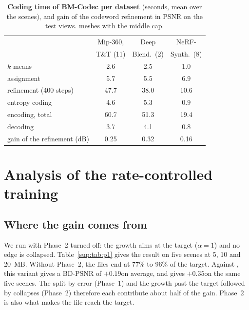 \begin{table}[h]\centering\footnotesize
\caption{\textbf{Coding time of BM-Codec per dataset} (seconds, mean over the scenes), and gain of the codeword refinement in PSNR on the test views. \MSc meshes with the middle cap.}
\label{sup:tab:time}
\setlength{\tabcolsep}{3pt}
\begin{tabular}{@{}lccc@{}}
\toprule
 & Mip-360, & Deep & NeRF- \\
 & T\&T (11) & Blend.\ (2) & Synth.\ (8) \\
\midrule
$k$-means & 2.6 & 2.5 & 1.0 \\
assignment & 5.7 & 5.5 & 6.9 \\
refinement (400 steps) & 47.7 & 38.0 & 10.6 \\
entropy coding & 4.6 & 5.3 & 0.9 \\
\midrule
encoding, total & 60.7 & 51.3 & 19.4 \\
decoding & 3.7 & 4.1 & 0.8 \\
\midrule
gain of the refinement (dB) & 0.25 & 0.32 & 0.16 \\
\bottomrule
\end{tabular}
\end{table}

\section{Analysis of the rate-controlled training}
\label{sup:training}

\subsection{Where the gain comes from}
We run \BM with Phase~2 turned off: the growth aims at the target ($\alpha = 1$) and no edge is collapsed. Table~\ref{sup:tab:p1} gives the result on five scenes at 5, 10 and 20~MB. Without Phase~2, the files end at 77\% to 96\% of the target. Against \MSc, this variant gives a BD-PSNR of $+0.19$\dB on average, and \BM gives $+0.35$\dB on the same five scenes. The split by error (Phase~1) and the growth past the target followed by collapses (Phase~2) therefore each contribute about half of the gain. Phase~2 is also what makes the file reach the target.

